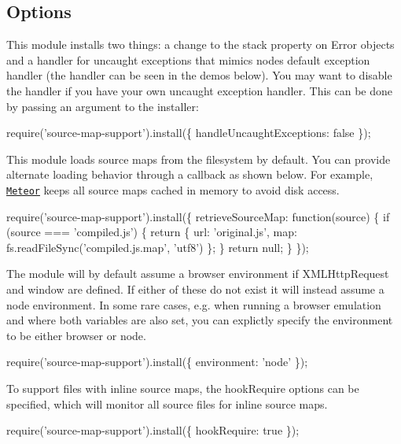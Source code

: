 \subsection*{Options}

This module installs two things\+: a change to the {\ttfamily stack} property on {\ttfamily Error} objects and a handler for uncaught exceptions that mimics node\textquotesingle{}s default exception handler (the handler can be seen in the demos below). You may want to disable the handler if you have your own uncaught exception handler. This can be done by passing an argument to the installer\+:


\begin{DoxyCode}
require('source-map-support').install(\{
  handleUncaughtExceptions: false
\});
\end{DoxyCode}


This module loads source maps from the filesystem by default. You can provide alternate loading behavior through a callback as shown below. For example, \href{https://github.com/meteor}{\tt Meteor} keeps all source maps cached in memory to avoid disk access.


\begin{DoxyCode}
require('source-map-support').install(\{
  retrieveSourceMap: function(source) \{
    if (source === 'compiled.js') \{
      return \{
        url: 'original.js',
        map: fs.readFileSync('compiled.js.map', 'utf8')
      \};
    \}
    return null;
  \}
\});
\end{DoxyCode}


The module will by default assume a browser environment if X\+M\+L\+Http\+Request and window are defined. If either of these do not exist it will instead assume a node environment. In some rare cases, e.\+g. when running a browser emulation and where both variables are also set, you can explictly specify the environment to be either \textquotesingle{}browser\textquotesingle{} or \textquotesingle{}node\textquotesingle{}.


\begin{DoxyCode}
require('source-map-support').install(\{
  environment: 'node'
\});
\end{DoxyCode}


To support files with inline source maps, the {\ttfamily hook\+Require} options can be specified, which will monitor all source files for inline source maps.


\begin{DoxyCode}
require('source-map-support').install(\{
  hookRequire: true
\});
\end{DoxyCode}



